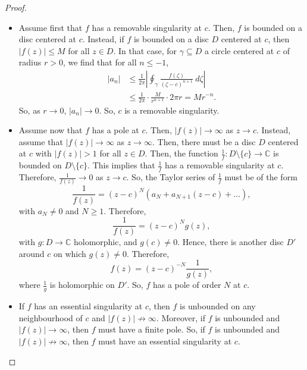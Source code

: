 \documentclass[a4paper, openany]{memoir}
\theoremstyle{definition}
\theoremstyle{plain}
\begin{document}
\begin{proof}
\hspace*{0pt}
\begin{itemize}
    \item Assume first that $f$ has a removable singularity at $c$. Then, $f$ is bounded on a disc centered at $c$. Instead, if $f$ is bounded on a disc $D$ centered at $c$, then $|f(z)| \leq M$ for all $z \in D$. In that case, for $\gamma \subseteq D$ a circle centered at $c$ of radius $r > 0$, we find that for all $n \leq -1$,
    \begin{align*}
        |a_n| &\leq \frac{1}{2\pi} \left|\oint_\gamma \frac{f(\zeta)}{(\zeta - c)^{n+1}} \ d\zeta \right| \\
        &\leq \frac{1}{2\pi} \cdot \frac{M}{r^{n+1}} \cdot 2\pi r = Mr^{-n}.
    \end{align*}
    So, as $r \to 0$, $|a_n| \to 0$. So, $c$ is a removable singularity.
    
    \item Assume now that $f$ has a pole at $c$. Then, $|f(z)| \to \infty$ as $z \to c$. Instead, assume that $|f(z)| \to \infty$ as $z \to \infty$. Then, there must be a disc $D$ centered at $c$ with $|f(z)| > 1$ for all $z \in D$. Then, the function $\frac{1}{f}: D \setminus \{c\} \to \mathbb{C}$ is bounded on $D \setminus \{c\}$. This implies that $\frac{1}{f}$ has a removable singularity at $c$. Therefore, $\frac{1}{f(z)} \to 0$ as $z \to c$. So, the Taylor series of $\frac{1}{f}$ must be of the form
    \[\frac{1}{f(z)} = (z - c)^N (a_N + a_{N+1} (z - c) + \dots),\]
    with $a_N \neq 0$ and $N \geq 1$. Therefore, 
    \[\frac{1}{f(z)} = (z - c)^N g(z),\]
    with $g: D \to \mathbb{C}$ holomorphic, and $g(c) \neq 0$. Hence, there is another disc $D'$ around $c$ on which $g(z) \neq 0$. Therefore,
    \[f(z) = (z - c)^{-N} \frac{1}{g(z)},\]
    where $\frac{1}{g}$ is holomorphic on $D'$. So, $f$ has a pole of order $N$ at $c$.
    
    \item If $f$ has an essential singularity at $c$, then $f$ is unbounded on any neighbourhood of $c$ and $|f(z)| \not\to \infty$. Moreover, if $f$ is unbounded and $|f(z)| \to \infty$, then $f$ must have a finite pole. So, if $f$ is unbounded and $|f(z)| \not\to \infty$, then $f$ must have an essential singularity at $c$.
\end{itemize}
\end{proof}
\end{document}
